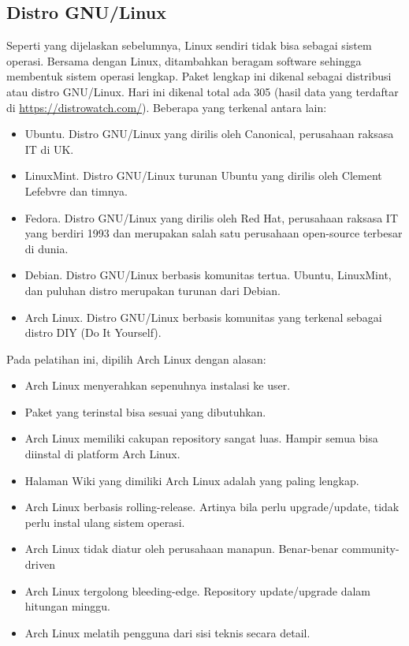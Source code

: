 \documentclass[12pt,]{article}
\begin{document}
	\subsection{Distro GNU/Linux}
	Seperti yang dijelaskan sebelumnya, Linux sendiri tidak bisa sebagai sistem operasi.
	Bersama dengan Linux, ditambahkan beragam software sehingga membentuk sistem operasi lengkap.
	Paket lengkap ini dikenal sebagai distribusi atau distro GNU/Linux.
	Hari ini dikenal total ada 305 (hasil data yang terdaftar di \url{https://distrowatch.com/}).
	Beberapa yang terkenal antara lain:
	\begin{itemize}
		\item Ubuntu. Distro GNU/Linux yang dirilis oleh Canonical, perusahaan raksasa IT di UK.
		\item LinuxMint. Distro GNU/Linux turunan Ubuntu yang dirilis oleh Clement Lefebvre dan timnya.
		\item Fedora. Distro GNU/Linux yang dirilis oleh Red Hat,
		perusahaan raksasa IT yang berdiri 1993 dan merupakan salah satu perusahaan open-source terbesar di dunia.
		\item Debian. Distro GNU/Linux berbasis komunitas tertua. Ubuntu, LinuxMint, dan puluhan distro merupakan turunan dari Debian.
		\item Arch Linux. Distro GNU/Linux berbasis komunitas yang terkenal sebagai distro DIY (Do It Yourself).
	\end{itemize}

	Pada pelatihan ini, dipilih Arch Linux dengan alasan:
	\begin{itemize}
		\item Arch Linux menyerahkan sepenuhnya instalasi ke user.
		\item Paket yang terinstal bisa sesuai yang dibutuhkan.
		\item Arch Linux memiliki cakupan repository sangat luas.
		Hampir semua bisa diinstal di platform Arch Linux.
		\item Halaman Wiki yang dimiliki Arch Linux adalah yang paling lengkap.
		\item Arch Linux berbasis rolling-release.
		Artinya bila perlu upgrade/update, tidak perlu instal ulang sistem operasi.
		\item Arch Linux tidak diatur oleh perusahaan manapun.
		Benar-benar community-driven
		\item Arch Linux tergolong bleeding-edge. Repository update/upgrade dalam hitungan minggu.
		\item Arch Linux melatih pengguna dari sisi teknis secara detail.
	\end{itemize}
\end{document}
